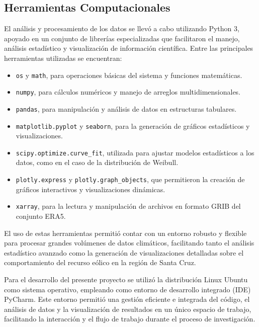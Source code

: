 \documentclass[a4paper,12pt]{article}
\begin{document}
		\subsection{Herramientas Computacionales}
		
		El análisis y procesamiento de los datos se llevó a cabo utilizando Python 3, apoyado en un conjunto de librerías especializadas que facilitaron el manejo, análisis estadístico y visualización de información científica. Entre las principales herramientas utilizadas se encuentran:
		
		\begin{itemize}
			\item \texttt{os} y \texttt{math}, para operaciones básicas del sistema y funciones matemáticas.
			\item \texttt{numpy}, para cálculos numéricos y manejo de arreglos multidimensionales.
			\item \texttt{pandas}, para manipulación y análisis de datos en estructuras tabulares.
			\item \texttt{matplotlib.pyplot} y \texttt{seaborn}, para la generación de gráficos estadísticos y visualizaciones.
			\item \texttt{scipy.optimize.curve\_fit}, utilizada para ajustar modelos estadísticos a los datos, como en el caso de la distribución de Weibull.
			\item \texttt{plotly.express} y \texttt{plotly.graph\_objects}, que permitieron la creación de gráficos interactivos y visualizaciones dinámicas.
			\item \texttt{xarray}, para la lectura y manipulación de archivos en formato GRIB del conjunto ERA5.
		\end{itemize}
		
		El uso de estas herramientas permitió contar con un entorno robusto y flexible para procesar grandes volúmenes de datos climáticos, facilitando tanto el análisis estadístico avanzado como la generación de visualizaciones detalladas sobre el comportamiento del recurso eólico en la región de Santa Cruz.
		
		Para el desarrollo del presente proyecto se utilizó la distribución Linux Ubuntu como sistema operativo, empleando como entorno de desarrollo integrado (IDE) PyCharm. Este entorno permitió una gestión eficiente e integrada del código, el análisis de datos y la visualización de resultados en un único espacio de trabajo, facilitando la interacción y el flujo de trabajo durante el proceso de investigación.
		
\end{document}
